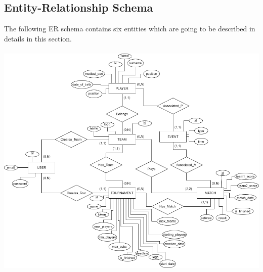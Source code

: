 \subsection{Entity-Relationship Schema} 

The following ER schema contains six entities which are going to be described in details in this section.\\ \\

\includegraphics[scale = 0.50]{sections/DLL/ERSchema.png}\\
\newpage

